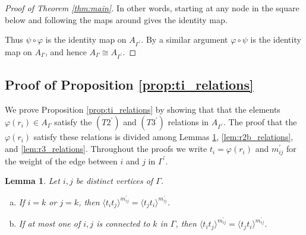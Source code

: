 \documentclass[11pt]{amsart}
\newtheorem{lem}[thm]{Lemma}
\theoremstyle{definition}
\begin{document}
\begin{proof}[Proof of Theorem \ref{thm:main}]
In other words, starting at any node in the square below and following the maps around gives the identity map.

\begin{figure*}[h]
\hspace*{-4em}
\end{figure*}

Thus $\psi\circ\varphi$ is the identity map on $A_{\Gamma^{\prime}}$.  By a similar argument $\varphi\circ\psi$ is the identity map on $A_\Gamma$, and hence $A_\Gamma\cong A_{\Gamma^{\prime}}$.
\end{proof}


\subsection{Proof of Proposition \ref{prop:ti_relations}}\label{sec:proof_of_ti_relations}

We prove Proposition \ref{prop:ti_relations} by showing that that the elements $\varphi(r_i)\in A_\Gamma$ satisfy the $(T2^\prime)$ and $(T3^\prime)$ relations in $A_{\Gamma^\prime}$.  The proof that the $\varphi(r_i)$ satisfy these relations is divided among Lemmas \ref{lem:r2a_relations}, \ref{lem:r2b_relations}, and \ref{lem:r3_relations}.  Throughout the proofs we write $t_i = \varphi(r_i)$ and $m_{ij}^\prime$ for the weight of the edge between $i$ and $j$ in $\Gamma^\prime$.


\begin{lem}\label{lem:r2a_relations}
Let $i,j$ be distinct vertices of $\Gamma$.
\begin{enumerate}[(a)]
\item If $i=k$ or $j=k$, then $\langle t_it_j \rangle^{m_{ij}^\prime} = \langle t_jt_i \rangle^{m_{ij}^\prime}$.
\item If at most one of $i,j$ is connected to $k$ in $\Gamma$, then $\langle t_it_j \rangle^{m_{ij}^\prime} = \langle t_jt_i \rangle^{m_{ij}^\prime}$.
\end{enumerate}
\end{lem}
\end{document}
